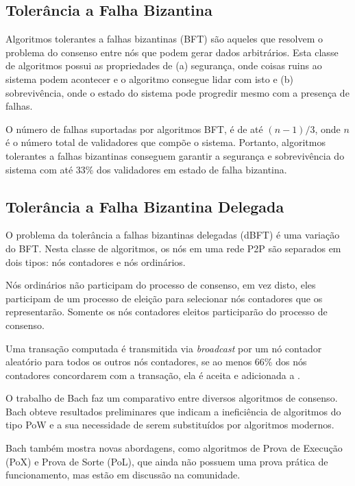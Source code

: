 \documentclass[tcc,capa]{texufpel}
\begin{document}
    \subsection{Tolerância a Falha Bizantina}\label{ssc:bft}
    
    Algoritmos tolerantes a falhas bizantinas (BFT) são aqueles que resolvem o problema do consenso entre nós que podem gerar dados arbitrários. Esta classe de algoritmos possui as propriedades de (a) segurança, onde coisas ruins ao sistema podem acontecer e o algoritmo consegue lidar com isto e (b) sobrevivência, onde o estado do sistema pode progredir mesmo com a presença de falhas.
    
    O número de falhas suportadas por algoritmos BFT, é de até $(n - 1)/3$, onde $n$ é o número total de validadores que compõe o sistema. Portanto, algoritmos tolerantes a falhas bizantinas conseguem garantir a segurança e sobrevivência do sistema com até 33\% dos validadores em estado de falha bizantina.
    
    \subsection{Tolerância a Falha Bizantina Delegada}\label{ssc:dbft}
    
    O problema da tolerância a falhas bizantinas delegadas (dBFT) é uma variação do BFT. Nesta classe de algoritmos, os nós em uma rede P2P são separados em dois tipos: nós contadores e nós ordinários.
    
    Nós ordinários não participam do processo de consenso, em vez disto, eles participam de um processo de eleição para selecionar nós contadores que os representarão. Somente os nós contadores eleitos participarão do processo de consenso.
    
    Uma transação computada é transmitida via \textit{broadcast} por um nó contador aleatório para todos os outros nós contadores, se ao menos 66\% dos nós contadores concordarem com a transação, ela é aceita e adicionada a \bchain.
    
    O trabalho de Bach \cite{bach2018comparative} faz um comparativo entre diversos algoritmos de consenso. Bach obteve resultados preliminares que indicam a ineficiência de algoritmos do tipo PoW e a sua necessidade de serem substituídos por algoritmos modernos. 
    
    Bach também mostra novas abordagens, como algoritmos de Prova de Execução (PoX) e Prova de Sorte (PoL), que ainda não possuem uma prova prática de funcionamento, mas estão em discussão na comunidade.
    
\end{document}
